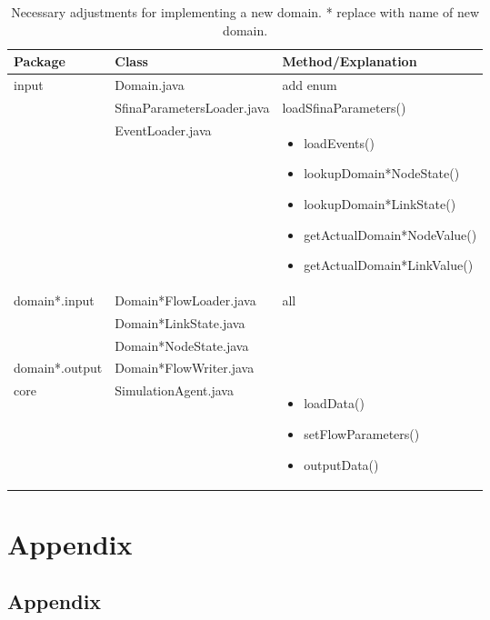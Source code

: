 \documentclass[11pt,fleqn]{book} %
\begin{document}
\begin{table}[h]
	\centering
	\begin{tabular}{|l|l|l|}
		\hline
		\rowcolor{Gray}
		Package & Class & Method/Explanation\\
		\hline 
		\multirow{3}{*}{input}& Domain.java & add enum\\
		\cline{2-3}
		& SfinaParametersLoader.java & loadSfinaParameters()\\
		\cline{2-3}
		& EventLoader.java & {\parbox{5.5cm}{
		\begin{itemize}[leftmargin=*,label={-}]
			\item loadEvents()
			\item lookupDomain*NodeState()
			\item lookupDomain*LinkState()
			\item getActualDomain*NodeValue()
			\item getActualDomain*LinkValue()
		\end{itemize}}}\\
		\hline
		\multirow{3}{*}{domain*.input} & Domain*FlowLoader.java & \multirow{4}{*}{all}\\
		\cline{2-2}
		& Domain*LinkState.java & \\
		\cline{2-2}
		& Domain*NodeState.java & \\
		\cline{1-2}
		domain*.output & Domain*FlowWriter.java & \\
		\hline
		core & SimulationAgent.java & {\parbox{4cm}{\begin{itemize}[label={-},leftmargin=*]
			\item loadData()
			\item setFlowParameters()
			\item outputData()
		\end{itemize}}} \\
		\hline
		\end{tabular}
		\caption{Necessary adjustments for implementing a new domain. * replace with name of new domain.}
		\end{table}


\part{Appendix}

\chapter{Appendix}
\end{document}
